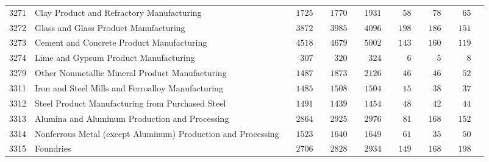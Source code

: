\documentclass[9pt, oneside]{article}   	%
\begin{document}
\begin{longtable}{lp{3 in}ccccccc}
3271  & Clay Product and Refractory Manufacturing & $\phantom{00}1725$ & $\phantom{00}1770$ & $\phantom{00}1931$ & $\phantom{000}58$ & $\phantom{000}78$ & $\phantom{000}65$ \\
3272  & Glass and Glass Product Manufacturing & $\phantom{00}3872$ & $\phantom{00}3985$ & $\phantom{00}4096$ & $\phantom{00}198$ & $\phantom{00}186$ & $\phantom{00}151$ \\
3273  & Cement and Concrete Product Manufacturing & $\phantom{00}4518$ & $\phantom{00}4679$ & $\phantom{00}5002$ & $\phantom{00}143$ & $\phantom{00}160$ & $\phantom{00}119$ \\
3274  & Lime and Gypsum Product Manufacturing & $\phantom{000}307$ & $\phantom{000}320$ & $\phantom{000}324$ & $\phantom{0000}6$ & $\phantom{0000}5$ & $\phantom{0000}8$ \\
3279  & Other Nonmetallic Mineral Product Manufacturing & $\phantom{00}1487$ & $\phantom{00}1873$ & $\phantom{00}2126$ & $\phantom{000}46$ & $\phantom{000}46$ & $\phantom{000}52$ \\
3311  & Iron and Steel Mills and Ferroalloy Manufacturing & $\phantom{00}1485$ & $\phantom{00}1508$ & $\phantom{00}1504$ & $\phantom{000}15$ & $\phantom{000}38$ & $\phantom{000}37$ \\
3312  & Steel Product Manufacturing from Purchased Steel & $\phantom{00}1491$ & $\phantom{00}1439$ & $\phantom{00}1454$ & $\phantom{000}48$ & $\phantom{000}42$ & $\phantom{000}44$ \\
3313  & Alumina and Aluminum Production and Processing & $\phantom{00}2864$ & $\phantom{00}2925$ & $\phantom{00}2976$ & $\phantom{000}81$ & $\phantom{00}168$ & $\phantom{00}152$ \\
3314  & Nonferrous Metal (except Aluminum) Production and Processing & $\phantom{00}1523$ & $\phantom{00}1640$ & $\phantom{00}1649$ & $\phantom{000}61$ & $\phantom{000}35$ & $\phantom{000}50$ \\
3315  & Foundries & $\phantom{00}2706$ & $\phantom{00}2828$ & $\phantom{00}2934$ & $\phantom{00}149$ & $\phantom{00}168$ & $\phantom{00}198$ \\


\end{longtable}
\end{document}
